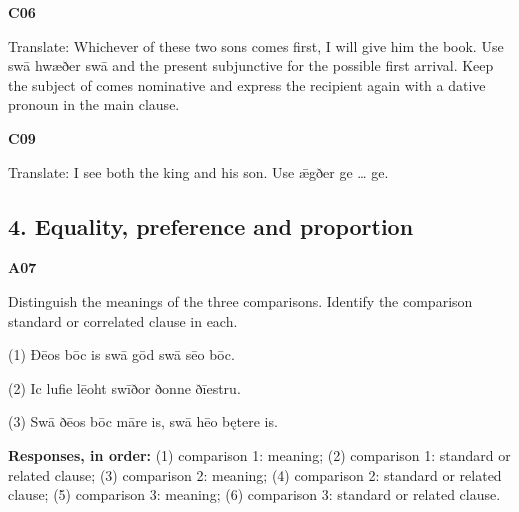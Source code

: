 \par\begin{minipage}{\linewidth}\raggedright
\textbf{C06}

Translate: Whichever of these two sons comes first, I will give him the book. Use swā hwæðer swā and the present subjunctive for the possible first arrival. Keep the subject of comes nominative and express the recipient again with a dative pronoun in the main clause.

\end{minipage}\par\addvspace{4pt}

\par\begin{minipage}{\linewidth}\raggedright
\textbf{C09}

Translate: I see both the king and his son. Use ǣgðer ge … ge.

\end{minipage}\par\addvspace{4pt}

\subsection*{4. Equality, preference and proportion}

\par\begin{minipage}{\linewidth}\raggedright
\textbf{A07}

Distinguish the meanings of the three comparisons. Identify the comparison standard or correlated clause in each.

(1) Ðēos bōc is swā gōd swā sēo bōc.

(2) Ic lufie lēoht swīðor ðonne ðīestru.

(3) Swā ðēos bōc māre is, swā hēo bętere is.

\textbf{Responses, in order:} (1) comparison 1: meaning; (2) comparison 1: standard or related clause; (3) comparison 2: meaning; (4) comparison 2: standard or related clause; (5) comparison 3: meaning; (6) comparison 3: standard or related clause.

\end{minipage}\par\addvspace{4pt}

